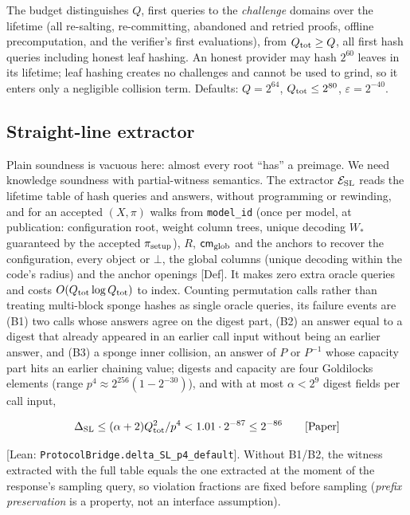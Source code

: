 \documentclass[10pt]{article}
\begin{document}
The budget distinguishes $Q$, first queries to the \emph{challenge} domains over the lifetime (all re-salting, re-committing, abandoned and retried proofs, offline precomputation, and the verifier's first evaluations), from $Q_{\rm tot}\ge Q$, all first hash queries including honest leaf hashing. An honest provider may hash $2^{60}$ leaves in its lifetime; leaf hashing creates no challenges and cannot be used to grind, so it enters only a negligible collision term. Defaults: $Q=2^{64}$, $Q_{\rm tot}\le2^{80}$, $\varepsilon=2^{-40}$.

\subsection{Straight-line extractor}
Plain soundness is vacuous here: almost every root ``has'' a preimage. We need knowledge soundness with partial-witness semantics. The extractor $\mathcal E_{\rm SL}$ reads the lifetime table of hash queries and answers, without programming or rewinding, and for an accepted $(X,\pi)$ walks from \texttt{model\_\allowbreak{}id} (once per model, at publication: configuration root, weight column trees, unique decoding $W_*$ guaranteed by the accepted $\pi_{\rm setup}$), $R$, $\mathsf{cm}_{\rm glob}$ and the anchors to recover the configuration, every object or $\bot$, the global columns (unique decoding within the code's radius) and the anchor openings [Def]. It makes zero extra oracle queries and costs $O(Q_{\rm tot}\log Q_{\rm tot})$ to index. Counting permutation calls rather than treating multi-block sponge hashes as single oracle queries, its failure events are (B1) two calls whose answers agree on the digest part, (B2) an answer equal to a digest that already appeared in an earlier call input without being an earlier answer, and (B3) a sponge inner collision, an answer of $P$ or $P^{-1}$ whose capacity part hits an earlier chaining value; digests and capacity are four Goldilocks elements (range $p^4\approx2^{256}(1-2^{-30})$), and with at most $\alpha<2^9$ digest fields per call input,

\[\Delta_{\rm SL}\le(\alpha+2)Q_{\rm tot}^2/p^4<1.01\cdot 2^{-87}\le 2^{-86}\qquad[\text{Paper}]\]

[Lean: \texttt{ProtocolBridge.\allowbreak{}delta\_\allowbreak{}SL\_\allowbreak{}p4\_\allowbreak{}default}]. Without B1/B2, the witness extracted with the full table equals the one extracted at the moment of the response's sampling query, so violation fractions are fixed before sampling (\emph{prefix preservation} is a property, not an interface assumption).
\end{document}
